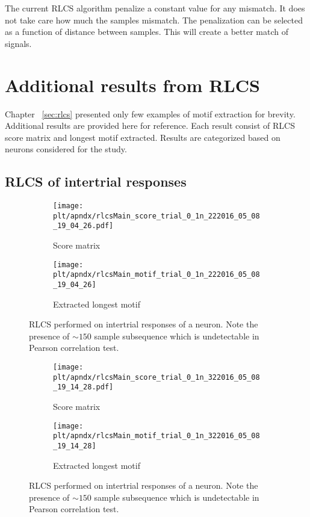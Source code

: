 \documentclass[MTech]{iitmdiss}
\newcommand{\plt}{thesis_plots}
\begin{document}
The current RLCS algorithm penalize a constant value for any mismatch. It does not take care how much the samples mismatch. The penalization can be selected as a function of distance between samples. This will create a better match of signals. 


\appendix
\chapter{Additional results from RLCS}
\label{chap:rlcsplots_appndx}
Chapter ~\ref{sec:rlcs} presented only few examples of motif extraction for brevity. Additional results are provided here for reference. Each result consist of RLCS score matrix and longest motif extracted. Results are categorized based on neurons considered for the study.
\section{RLCS of intertrial responses} %
\label{sec:rlcs_between_intertrial_responses}
\begin{figure}[h]
  \begin{subfigure}[b]{0.5\textwidth}
    \texttt{[image: \\plt/apndx/rlcsMain\_score\_trial\_0\_1n\_222016\_05\_08\_19\_04\_26.pdf]}
    \caption{Score matrix}
  \end{subfigure}%
  \begin{subfigure}[b]{0.5\textwidth}
    \texttt{[image: \\plt/apndx/rlcsMain\_motif\_trial\_0\_1n\_222016\_05\_08\_19\_04\_26]}
    \caption{Extracted longest motif}
  \end{subfigure}%
  \caption{RLCS performed on intertrial responses of a neuron. Note the presence of $\sim 150$ sample subsequence which is undetectable in Pearson correlation test.}
  \label{fig:}
\end{figure}

\begin{figure}[h]
  \begin{subfigure}[b]{0.5\textwidth}
    \texttt{[image: \\plt/apndx/rlcsMain\_score\_trial\_0\_1n\_322016\_05\_08\_19\_14\_28.pdf]}
    \caption{Score matrix}
  \end{subfigure}%
  \begin{subfigure}[b]{0.5\textwidth}
    \texttt{[image: \\plt/apndx/rlcsMain\_motif\_trial\_0\_1n\_322016\_05\_08\_19\_14\_28]}
    \caption{Extracted longest motif}
  \end{subfigure}%
  \caption{RLCS performed on intertrial responses of a neuron. Note the presence of $\sim 150$ sample subsequence which is undetectable in Pearson correlation test.}
  \label{fig:}
\end{figure}
\end{document}
